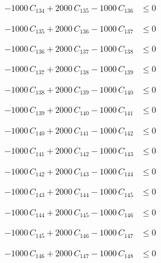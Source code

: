 \documentclass[a4paper,11pt]{article}
\begin{document}
\begin{align}
-1000\,C_{134} + 2000\,C_{135} - 1000\,C_{136} &\leq 0 \nonumber
\end{align}

\begin{align}
-1000\,C_{135} + 2000\,C_{136} - 1000\,C_{137} &\leq 0 \nonumber
\end{align}

\begin{align}
-1000\,C_{136} + 2000\,C_{137} - 1000\,C_{138} &\leq 0 \nonumber
\end{align}

\begin{align}
-1000\,C_{137} + 2000\,C_{138} - 1000\,C_{139} &\leq 0 \nonumber
\end{align}

\begin{align}
-1000\,C_{138} + 2000\,C_{139} - 1000\,C_{140} &\leq 0 \nonumber
\end{align}

\begin{align}
-1000\,C_{139} + 2000\,C_{140} - 1000\,C_{141} &\leq 0 \nonumber
\end{align}

\begin{align}
-1000\,C_{140} + 2000\,C_{141} - 1000\,C_{142} &\leq 0 \nonumber
\end{align}

\begin{align}
-1000\,C_{141} + 2000\,C_{142} - 1000\,C_{143} &\leq 0 \nonumber
\end{align}

\begin{align}
-1000\,C_{142} + 2000\,C_{143} - 1000\,C_{144} &\leq 0 \nonumber
\end{align}

\begin{align}
-1000\,C_{143} + 2000\,C_{144} - 1000\,C_{145} &\leq 0 \nonumber
\end{align}

\begin{align}
-1000\,C_{144} + 2000\,C_{145} - 1000\,C_{146} &\leq 0 \nonumber
\end{align}

\begin{align}
-1000\,C_{145} + 2000\,C_{146} - 1000\,C_{147} &\leq 0 \nonumber
\end{align}

\begin{align}
-1000\,C_{146} + 2000\,C_{147} - 1000\,C_{148} &\leq 0 \nonumber
\end{align}
\end{document}
